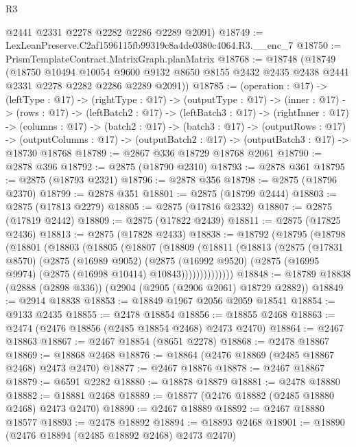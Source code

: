 \begin{lexlean}{R3}
\begin{coremodule}
      @2441
      @2331
      @2278
      @2282
      @2286
      @2289
      @2091)
@18749 := LexLeanPreserve.C2af1596115fb99319c8a4de0380c4064.R3.__enc_7
@18750 := PrismTemplateContract.MatrixGraph.planMatrix
@18768 := @18748
    (@18749
      (@18750
        @10494
        @10054
        @9600
        @9132
        @8650
        @8155
        @2432
        @2435
        @2438
        @2441
        @2331
        @2278
        @2282
        @2286
        @2289
        @2091))
@18785 := (operation : @17) ->
  (leftType : @17) ->
  (rightType : @17) ->
  (outputType : @17) ->
  (inner : @17) ->
  (rows : @17) ->
  (leftBatch2 : @17) ->
  (leftBatch3 : @17) ->
  (rightInner : @17) ->
  (columns : @17) ->
  (batch2 : @17) ->
  (batch3 : @17) ->
  (outputRows : @17) ->
  (outputColumns : @17) -> (outputBatch2 : @17) -> (outputBatch3 : @17) -> @18730 @18768
@18789 := @2867 @336 @18729 @18768 @2061
@18790 := @2878 @396
@18792 := @2875 (@18790 @2310)
@18793 := @2878 @361
@18795 := @2875 (@18793 @2321)
@18796 := @2878 @356
@18798 := @2875 (@18796 @2370)
@18799 := @2878 @351
@18801 := @2875 (@18799 @2444)
@18803 := @2875 (@17813 @2279)
@18805 := @2875 (@17816 @2332)
@18807 := @2875 (@17819 @2442)
@18809 := @2875 (@17822 @2439)
@18811 := @2875 (@17825 @2436)
@18813 := @2875 (@17828 @2433)
@18838 := @18792
    (@18795
      (@18798
        (@18801
          (@18803
            (@18805
              (@18807
                (@18809
                  (@18811
                    (@18813
                      (@2875
                        (@17831 @8570)
                        (@2875
                          (@16989 @9052)
                          (@2875
                            (@16992 @9520)
                            (@2875 (@16995 @9974) (@2875 (@16998 @10414) @10843))))))))))))))
@18848 := @18789 @18838 (@2888 (@2898 @336)) (@2904 (@2905 (@2906 @2061) @18729 @2882))
@18849 := @2914 @18838
@18853 := @18849 @1967 @2056 @2059 @18541
@18854 := @9133 @2435
@18855 := @2478 @18854
@18856 := @18855 @2468
@18863 := @2474 (@2476 @18856 (@2485 @18854 @2468) @2473 @2470)
@18864 := @2467 @18863
@18867 := @2467 @18854 (@8651 @2278)
@18868 := @2478 @18867
@18869 := @18868 @2468
@18876 := @18864 (@2476 @18869 (@2485 @18867 @2468) @2473 @2470)
@18877 := @2467 @18876
@18878 := @2467 @18867
@18879 := @6591 @2282
@18880 := @18878 @18879
@18881 := @2478 @18880
@18882 := @18881 @2468
@18889 := @18877 (@2476 @18882 (@2485 @18880 @2468) @2473 @2470)
@18890 := @2467 @18889
@18892 := @2467 @18880 @18577
@18893 := @2478 @18892
@18894 := @18893 @2468
@18901 := @18890 (@2476 @18894 (@2485 @18892 @2468) @2473 @2470)

\end{coremodule}
\end{lexlean}
